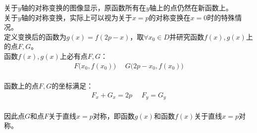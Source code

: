 \documentclass[UTF8]{ctexart}
\begin{document}
    关于$y$轴的对称变换的图像显示，原函数所有在$y$轴上的点仍然在新函数上。\\[3mm]
    关于$y$轴的对称变换，实际上可以视为关于$x=p$的对称变换在$x=0$时的特殊情况。\\[6mm]
    定义变换后的函数为$g(x)=f(2p-x)$，取$\forall x_0\in D$并研究函数$f(x),g(x)$上的点$F,G$。\\[3mm]
    函数$f(x),g(x)$上必有点$F,G$：
    \begin{align}
        F\big(x_0,f(x_0)\big)~~~~~~G\big(2p-x_0,f(x_0)\big)
    \end{align}\\
    函数上的点$F,G$的坐标满足：
    \begin{align}
        F_x+G_x=2p~~~~~~F_y=G_y
    \end{align}\\
    因此点$G$和点$F$关于直线$x=p$对称，即函数$g(x)$和函数$f(x)$关于直线$x=p$对称。
    
\newpage
\end{document}
